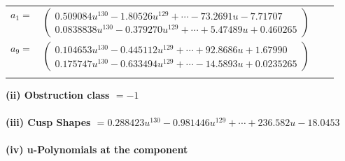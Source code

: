 \documentclass[1p]{elsarticle_modified}
\theoremstyle{definition}
\begin{document}
\begin{tabular}{m{7pt} m{180pt} m{7pt} m{180pt} }
\flushright $a_{1}=$&$\begin{pmatrix}0.509084 u^{130}-1.80526 u^{129}+\cdots-73.2691 u-7.71707\\0.0838838 u^{130}-0.379270 u^{129}+\cdots+5.47489 u+0.460265\end{pmatrix}$ \\
\flushright $a_{9}=$&$\begin{pmatrix}0.104653 u^{130}-0.445112 u^{129}+\cdots+92.8686 u+1.67990\\0.175747 u^{130}-0.633494 u^{129}+\cdots-14.5893 u+0.0235265\end{pmatrix}$\\&\end{tabular}
\flushleft \textbf{(ii) Obstruction class $= -1$}\\~\\
\flushleft \textbf{(iii) Cusp Shapes $= 0.288423 u^{130}-0.981446 u^{129}+\cdots+236.582 u-18.0453$}\\~\\
\newpage\renewcommand{\arraystretch}{1}
\flushleft \textbf{(iv) u-Polynomials at the component}\newline \\
\end{document}
